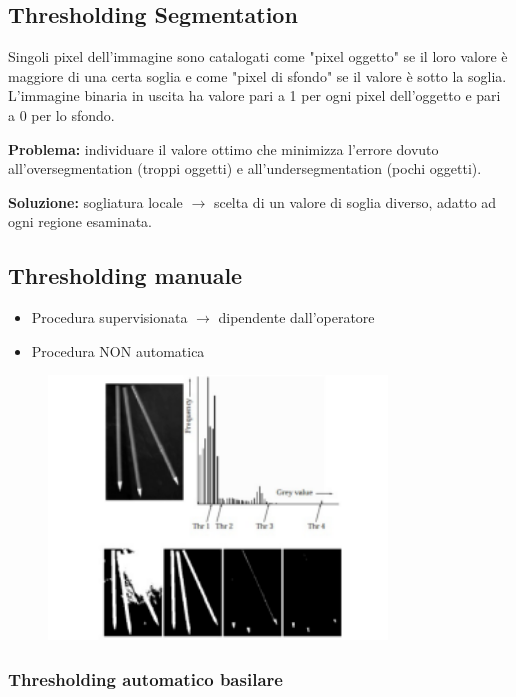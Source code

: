 \subsection{Thresholding Segmentation}

Singoli pixel dell'immagine sono catalogati come "pixel oggetto" se il loro valore è maggiore di una certa soglia e come "pixel di sfondo"
se il valore è sotto la soglia. L'immagine binaria in uscita ha valore pari a 1 per ogni pixel dell'oggetto e pari a 0 per lo sfondo.

\begin{trivlist}
    \item \textbf{Problema:} individuare il valore ottimo che minimizza l'errore dovuto all'oversegmentation (troppi oggetti) e
    all'undersegmentation (pochi oggetti).
    \item \textbf{Soluzione:} sogliatura locale $\rightarrow$ scelta di un valore di soglia diverso,
    adatto ad ogni regione esaminata.
\end{trivlist}

\subsection{Thresholding manuale}
\begin{itemize}
    \item Procedura supervisionata $\rightarrow$ dipendente dall'operatore
    \item Procedura NON automatica
\end{itemize}

\begin{figure}[H]
    \centering
    \includegraphics[width=9cm, keepaspectratio]{capitoli/immagini/imgs/trash-manuale.png}
\end{figure}

\subsubsection{Thresholding automatico basilare}

